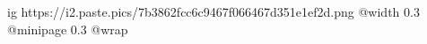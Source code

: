  
 
 
 
 

\ifcmt
	ig https://i2.paste.pics/7b3862fcc6c9467f066467d351e1ef2d.png
  @width 0.3
  @minipage 0.3
  @wrap \parpic[r]
\fi
